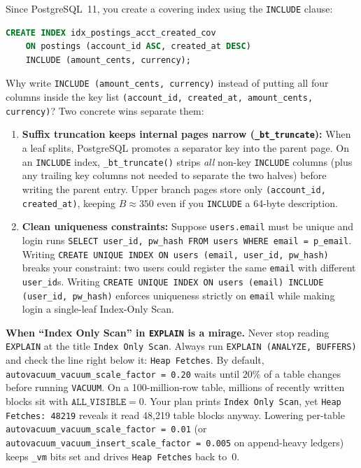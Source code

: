 Since PostgreSQL~11, you create a covering index using the \texttt{INCLUDE} clause:
\begin{lstlisting}[language=SQL]
CREATE INDEX idx_postings_acct_created_cov
    ON postings (account_id ASC, created_at DESC)
    INCLUDE (amount_cents, currency);
\end{lstlisting}
Why write \texttt{INCLUDE (amount\_cents, currency)} instead of putting all four columns inside the key list \texttt{(account\_id, created\_at, amount\_cents, currency)}? Two concrete wins separate them:
\begin{enumerate}
  \item \textbf{Suffix truncation keeps internal pages narrow (\texttt{\_bt\_truncate}):} When a leaf splits, PostgreSQL promotes a separator key into the parent page. On an \texttt{INCLUDE} index, \texttt{\_bt\_truncate()} strips \emph{all} non-key \texttt{INCLUDE} columns (plus any trailing key columns not needed to separate the two halves) before writing the parent entry. Upper branch pages store only \texttt{(account\_id, created\_at)}, keeping $B \approx 350$ even if you \texttt{INCLUDE} a 64-byte description.
  \item \textbf{Clean uniqueness constraints:} Suppose \texttt{users.email} must be unique and login runs \texttt{SELECT user\_id, pw\_hash FROM users WHERE email = p\_email}. Writing \texttt{CREATE UNIQUE INDEX ON users (email, user\_id, pw\_hash)} breaks your constraint: two users could register the same \texttt{email} with different \texttt{user\_id}s. Writing \texttt{CREATE UNIQUE INDEX ON users (email) INCLUDE (user\_id, pw\_hash)} enforces uniqueness strictly on \texttt{email} while making login a single-leaf Index-Only Scan.
\end{enumerate}

\begin{trapbox}
\textbf{When ``Index Only Scan'' in \texttt{EXPLAIN} is a mirage.} Never stop reading \texttt{EXPLAIN} at the title \texttt{Index Only Scan}. Always run \texttt{EXPLAIN (ANALYZE, BUFFERS)} and check the line right below it: \texttt{Heap Fetches}. By default, \texttt{autovacuum\_vacuum\_scale\_factor = 0.20} waits until $20\%$ of a table changes before running \texttt{VACUUM}. On a 100-million-row table, millions of recently written blocks sit with $\texttt{ALL\_VISIBLE} = 0$. Your plan prints \texttt{Index Only Scan}, yet \texttt{Heap Fetches: 48219} reveals it read 48,219 table blocks anyway. Lowering per-table \texttt{autovacuum\_vacuum\_scale\_factor = 0.01} (or \texttt{autovacuum\_vacuum\_insert\_scale\_factor = 0.005} on append-heavy ledgers) keeps \texttt{\_vm} bits set and drives \texttt{Heap Fetches} back to~$0$.
\end{trapbox}

